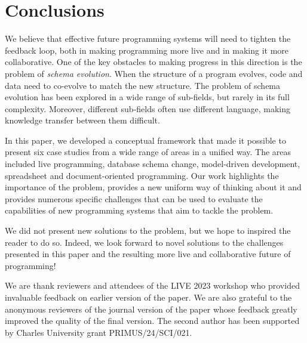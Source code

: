 \documentclass[english,crc]{programming}
\begin{document}
\section{Conclusions}
We believe that effective future programming systems will need to tighten the feedback loop,
both in making programming more live and in making it more collaborative. One of the key obstacles
to making progress in this direction is the problem of \emph{schema evolution}. When the structure
of a program evolves, code and data need to co-evolve to match the new structure.
%
The problem of schema evolution has been explored in a wide range of sub-fields, but rarely in its
full complexity. Moreover, different sub-fields often use different language, making knowledge
transfer between them difficult.

In this paper, we developed a conceptual framework
that made it possible to present six case studies from a wide range of areas in a unified way.
The areas included live programming, database schema change, model-driven development,
spreadsheet and document-oriented programming.
%
Our work highlights the importance
of the problem, provides a new uniform way of thinking about it and provides numerous specific
challenges that can be used to evaluate the capabilities of new programming systems that aim
to tackle the problem.

We did not present new solutions to the problem, but we hope to inspired the reader to
do so. Indeed, we look forward to novel solutions to the challenges presented in this paper and
the resulting more live and collaborative future of programming!

\acks
We are thank reviewers and attendees of the LIVE 2023 workshop who provided invaluable
feedback on earlier version of the paper. We are also grateful to the anonymous reviewers
of the journal version of the paper whose feedback greatly improved the quality of the final
version. The second author has been supported by Charles University grant PRIMUS/24/SCI/021.

%
%
\printbibliography


\end{document}
